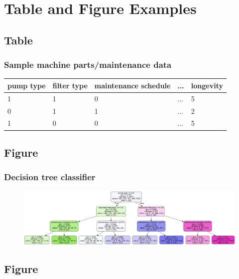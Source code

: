 \documentclass[
	11pt, %
]{beamer}
\begin{document}

\section{Table and Figure Examples}

\subsection{Table}

\begin{frame}
	\frametitle{Sample machine parts/maintenance data}

	\begin{table}
		\begin{tabular}{l l l l l}
			\toprule
			pump type & filter type & maintenance schedule & ... & longevity \\
			\midrule
			1 & 1 & 0 & ... & 5 \\
			0 & 1 & 1 & ... & 2 \\
			1 & 0 & 0 & ... & 5 \\
			\bottomrule
		\end{tabular}
	\end{table}
\end{frame}


\subsection{Figure}

\begin{frame}
	\frametitle{Decision tree classifier}
	
	\begin{figure}
		\includegraphics[width=1.0\linewidth]{decision_tree_graphviz.png}
	\end{figure}
\end{frame}

\subsection{Figure}
\end{document}
